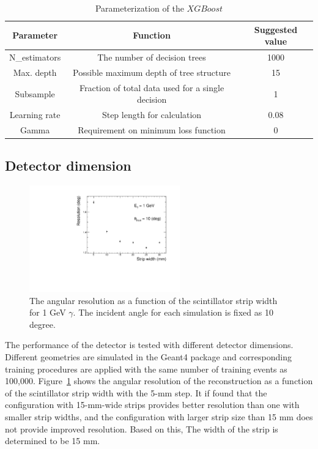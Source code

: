 \documentclass[jkps,preprint,fleqn,showpacs,showkeys]{revtex4}
\newcommand{\XGB}{XGBoost}
\begin{document}
\begin{table}[hbt!]
\centering
\caption{Parameterization of the $\XGB$}
\begin{tabular}{ccc}
\hline 
Parameter & Function & Suggested value \\ \hline 
N\_estimators & The number of decision trees & 1000 \\  
Max. depth & Possible maximum depth of tree structure & 15 \\ 
Subsample & Fraction of total data used for a single decision & 1 \\ 
Learning rate & Step length for calculation & 0.08 \\ 
Gamma & Requirement on minimum loss function & 0 \\ 
\hline
\end{tabular}
\label{tab:XgbPar}
\end{table}

\subsection{Detector dimension}
\begin{figure}[!hbt]
\includegraphics[width=0.58\textwidth]{figures/Fig2_reco_Width_width.pdf}
\caption{ The angular resolution as a function of the scintillator strip width for 1 GeV $\gamma$. The incident angle for each simulation is fixed as 10 degree.  }
\label{fig:angle_reco_width}
\end{figure}

The performance of the detector is tested with different detector dimensions. Different geometries are simulated in the Geant4 package and corresponding training procedures are applied with the same number of training events as 100,000. Figure~\ref{fig:angle_reco_width} shows the angular resolution of the reconstruction as a function of the scintillator strip width with the 5-mm step. It if found that the configuration with 15-mm-wide strips provides better resolution than one with smaller strip widths, and the configuration with larger strip size than 15 mm does not provide improved resolution. Based on this, The width of the strip is determined to be 15 mm.
\end{document}
